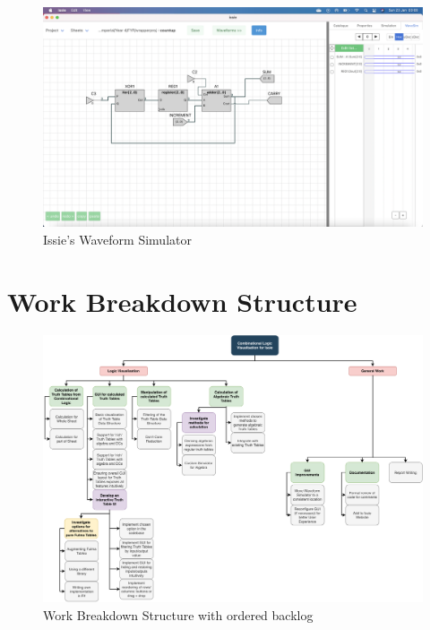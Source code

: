 \begin{figure} [h]
    \centering
    \includegraphics[width=\textwidth]{Appendices/IssieWaveSim.png}
    \caption{Issie's Waveform Simulator}
    \label{fig:IssieWS}
\end{figure}

\chapter{Work Breakdown Structure} \label{app:wbs}
\begin{figure}
    \centering
    \includegraphics{Appendices/wbs2.pdf}
    \caption{Work Breakdown Structure with ordered backlog}
    \label{fig:wbs2}
\end{figure}

